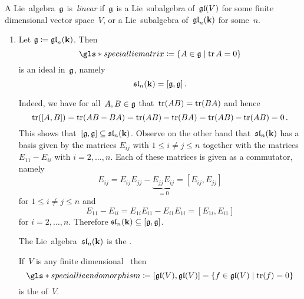 \begin{definition}
  A Lie~algebra~$\mathfrak{g}$ is~\emph{linear} if~$\mathfrak{g}$ is a Lie~subalgebra of~$\mathfrak{gl}(V)$ for some finite dimensional vector space~$V$, or a Lie~subalgebra of~$\mathfrak{gl}_n(\mathbf{k})$ for some~$n$.
\end{definition}


\begin{examples}
  \leavevmode
  \begin{enumerate}
  \item
    Let $\mathfrak{g} \coloneqq \mathfrak{gl}_n(\mathbf{k})$.
    Then
    \[
      \gls*{special lie matrix}
      \defined
      \{
        A \in \glie
      \suchthat
        \tr A = 0
      \}
    \]
    is an ideal in~$\mathfrak{g}$, namely
    \[
      \mathfrak{sl}_n(\mathbf{k})
      =
      [\mathfrak{g},\mathfrak{g}]  \,.
    \]
      
    Indeed, we have for all~$A, B \in \mathfrak{g}$ that~$\operatorname{tr}(AB) = \operatorname{tr}(BA)$ and hence
    \[
        \operatorname{tr}( [A,B] )
      = \operatorname{tr}(AB-BA)
      = \operatorname{tr}(AB) - \operatorname{tr}(BA)
      = \operatorname{tr}(AB) - \operatorname{tr}(AB)
      = 0  \,.
    \]
    This shows that~$[\mathfrak{g}, \mathfrak{g}] \subseteq \mathfrak{sl}_n(\mathbf{k})$.
    Observe on the other hand that~$\mathfrak{sl}_n(\mathbf{k})$ has a basis given by the matrices $E_{ij}$ with $1 \leq i \neq j \leq n$ together with the matrices $E_{11} - E_{ii}$ with $i = 2, \dotsc, n$.
    Each of these matrices is given as a commutator, namely
    \[
        E_{ij}
        =
        E_{ij} E_{jj} - \underbrace{ E_{jj} E_{ij} }_{=0}
        =
        [E_{ij}, E_{jj}]
    \]
    for $1 \leq i \neq j \leq n$ and
    \[
      E_{11} - E_{ii}
      =
      E_{1i} E_{i1} - E_{i1} E_{1i}
      =
      [E_{1i}, E_{i1}]
    \]
    for $i = 2, \dotsc, n$.
    Therefore $\mathfrak{sl}_n(\mathbf{k}) \subseteq [\mathfrak{g}, \mathfrak{g}]$.
    
    The Lie~algebra~$\mathfrak{sl}_n(\mathbf{k})$ is the .
    
    If~$V$ is any finite dimensional~{\vectorspace{$\kf$}} then
    \[
      \gls*{special lie endomorphism}
      \defined
      [\gllie(V), \gllie(V)]
      =
      \{
        f \in \gllie(V)
      \suchthat
        \tr(f) = 0
      \}
    \]
    is the  of~$V$.
   

\end{enumerate}
\end{examples}
